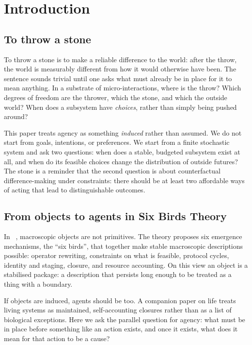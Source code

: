 \section{Introduction}
\label{sec:introduction}

\subsection{To throw a stone}
To throw a stone is to make a reliable difference to the world: after the throw, the world is measurably different from how it would otherwise have been. The sentence sounds trivial until one asks what must already be in place for it to mean anything. In a substrate of micro-interactions, where is the throw? Which degrees of freedom are the thrower, which the stone, and which the outside world? When does a subsystem have \emph{choices}, rather than simply being pushed around?

This paper treats agency as something \emph{induced} rather than assumed. We do not start from goals, intentions, or preferences. We start from a finite stochastic system and ask two questions: when does a stable, budgeted subsystem exist at all, and when do its feasible choices change the distribution of outside futures? The stone is a reminder that the second question is about counterfactual difference-making under constraints: there should be at least two affordable ways of acting that lead to distinguishable outcomes.

\subsection{From objects to agents in Six Birds Theory}
In \SBT\ \citep{six_birds_theory}, macroscopic objects are not primitives. The theory proposes six emergence mechanisms, the ``six birds'', that together make stable macroscopic descriptions possible: operator rewriting, constraints on what is feasible, protocol cycles, identity and staging, closure, and resource accounting. On this view an object is a stabilised package: a description that persists long enough to be treated as a thing with a boundary.

If objects are induced, agents should be too. A companion paper on life \citep{six_birds_life} treats living systems as maintained, self-accounting closures rather than as a list of biological exceptions. Here we ask the parallel question for agency: what must be in place before something like an action exists, and once it exists, what does it mean for that action to be a cause?

